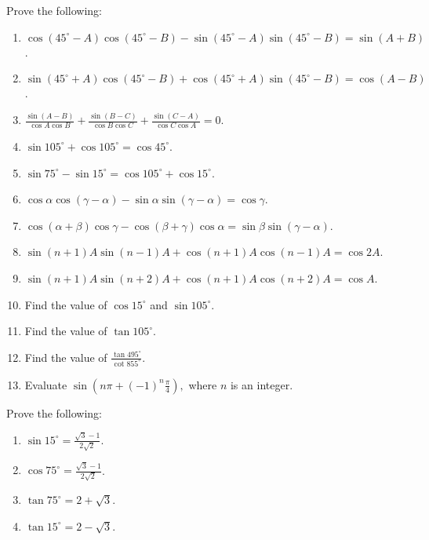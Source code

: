 Prove the following:

\begin{enumerate}
\item $\cos(45^{\circ} - A)\cos(45^{\circ} - B) - \sin(45^{\circ} - A)\sin(45^{\circ} - B) = \sin(A + B)$.

\item $\sin(45^{\circ} + A)\cos(45^\circ - B) + \cos(45^{\circ} + A)\sin(45^\circ - B) = \cos(A - B)$.

\item $\frac{\sin(A - B)}{\cos A\cos B} + \frac{\sin(B - C)}{\cos B\cos C} + \frac{\sin(C - A)}{\cos C\cos A} = 0$.

\item $\sin 105^\circ + \cos 105^\circ = \cos 45^\circ$.

\item $\sin 75^\circ - \sin 15^\circ = \cos 105^\circ + \cos 15^\circ$.

\item $\cos\alpha\cos(\gamma - \alpha) - \sin\alpha\sin(\gamma - \alpha) = \cos\gamma$.

\item $\cos(\alpha + \beta)\cos\gamma - \cos(\beta + \gamma)\cos\alpha = \sin\beta\sin(\gamma - \alpha)$.

\item $\sin(n + 1)A\sin(n - 1)A + \cos(n + 1)A\cos(n - 1)A = \cos 2A$.

\item $\sin(n + 1)A\sin(n + 2)A + \cos(n + 1)A\cos(n + 2)A = \cos A$.

\item Find the value of $\cos 15^\circ$ and $\sin 105^\circ$.

\item Find the value of $\tan 105^\circ$.

\item Find the value of $\frac{\tan 495^\circ}{\cot 855^\circ}$.

\item Evaluate $\sin\left(n\pi + (-1)^n \frac{\pi}{4}\right),$ where $n$ is an integer.
\end{enumerate}

Prove the following:

\begin{enumerate}[resume]
\item $\sin 15^\circ = \frac{\sqrt{3} - 1}{2\sqrt{2}}$.

\item $\cos 75^\circ = \frac{\sqrt{3} - 1}{2\sqrt{2}}$.

\item $\tan 75^\circ = 2 + \sqrt{3}$.

\item $\tan 15^\circ = 2 - \sqrt{3}$.
\end{enumerate}

